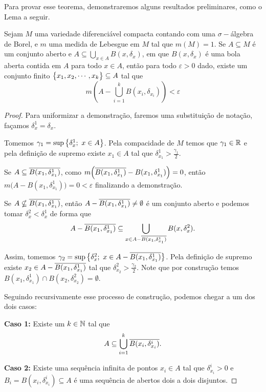 Para provar esse teorema, demonstraremos alguns resultados preliminares, como o Lema a seguir.

\begin{lema}\label{vit} Sejam $M$ uma variedade diferenciável compacta contando com uma $\sigma-$álgebra de Borel, e $m$ uma medida de Lebesgue em $M$ tal que $m(M)=1$. Se $A\subseteq M$ é um conjunto aberto e $A\subseteq\bigcup_{x\in A}B(x,\delta_x)$, em que $B(x,\delta_x)$ é uma bola aberta contida em $A$ para todo $x\in A$, então para todo $\varepsilon>0$ dado, existe um conjunto finito $\big\{x_1,x_2,\cdots,x_k\big\}\subseteq A$ tal que $$m\left(A-\bigcup_{i=1}^{k}B(x_i,\delta_{x_i})\right)<\varepsilon$$
\end{lema}

\begin{proof} Para uniformizar a demonstração, faremos uma substituição de notação, façamos $\delta_x^1=\delta_x$.

Tomemos $\gamma_1=\sup\big\{\delta_{x}^1;\ x\in A\big\}$. Pela compacidade de $M$ temos que $\gamma_1\in\mathbb{R}$ e pela definição de supremo existe $x_1\in A$ tal que $\delta_{x_1}^1>\frac{\gamma_1}{2}$. 

Se $A\subseteq \overline{B(x_1,\delta_{x_1}^1)}$, como $m\Big(\overline{B(x_1,\delta_{x_1}^1)}-B(x_1,\delta_{x_1}^1)\Big)=0$, então $m\big(A-B(x_1,\delta_{x_1}^1)\big)=0<\varepsilon$ finalizando a demonstração. 

Se $A\nsubseteq\overline{B(x_1,\delta_{x_1}^1)}$, então $A-\overline{B(x_1,\delta_{x_1}^1)}\neq\emptyset$ é um conjunto aberto e podemos tomar $\delta_x^2<\delta_x^1$ de forma que $$A-\overline{B(x_1,\delta_{x_1}^1)}\subseteq\bigcup_{x\in A-\overline{B(x_1,\delta_{x_1}^1)}}B(x,\delta_x^2).$$

Assim, tomemos $\gamma_2=\sup\big\{\delta_{x}^2;\ x\in A-\overline{B(x_1,\delta_{x_1}^1)}\big\}$. Pela definição de supremo existe $x_2\in A-\overline{B(x_1,\delta_{x_1}^1)}$ tal que $\delta_{x_2}^2>\frac{\gamma_2}{2}$. Note que por construção temos $B(x_1,\delta_{x_1}^1)\cap B(x_2,\delta_{x_2}^2)=\emptyset$.

Seguindo recursivamente esse processo de construção, podemos chegar a um dos dois casos:

\textbf{Caso 1:} Existe um $k\in\mathbb{N}$ tal que $$A\subseteq \bigcup_{i=1}^{k}\overline{B(x_i,\delta_{x_i}^i)}.$$

\textbf{Caso 2:} Existe uma sequência infinita de pontos $x_i\in A$ tal que $\delta_{x_i}^i>0$ e $B_i=B(x_i,\delta_{x_i}^i)\subseteq A$ é uma sequência de abertos dois a dois disjuntos. 


\end{proof}
